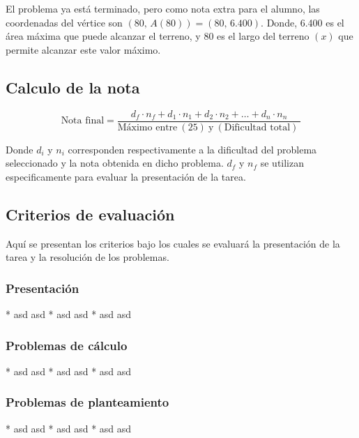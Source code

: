 \documentclass[]{srs2}
\begin{document}
El problema ya está terminado, pero como nota extra para el alumno,
las coordenadas del vértice son
\(\left(80,\,A\left(80\right)\right) = (80,\, 6.400)\). Donde, 6.400
es el área máxima que puede alcanzar el terreno, y 80 es el largo
del terreno \(\left(x\right)\) que permite alcanzar este valor máximo.

\subsection*{Calculo de la nota}

\begin{equation*}
  \text{Nota final} = \dfrac{d_{f}\cdot n_{f} + d_1 \cdot n_1+d_2 \cdot n_2+\dots+d_n \cdot n_n}{\text{Máximo entre}~\left(25\right)~\text{y}~\left(\text{Dificultad total}\right)~}
\end{equation*}

Donde $d_i$ y $n_i$ corresponden respectivamente a la dificultad del problema
seleccionado y la nota obtenida en dicho problema. $d_f$ y $n_f$ se utilizan
especificamente para evaluar la presentación de la tarea.

\subsection*{Criterios de evaluación}

Aquí se presentan los criterios bajo los cuales se evaluará la presentación
de la tarea y la resolución de los problemas.

\subsubsection*{Presentación}
\begin{lista}
* asd asd
* asd asd
* asd asd
\end{lista}
\subsubsection*{Problemas de cálculo}
\begin{lista}
* asd asd
* asd asd
* asd asd
\end{lista}
\subsubsection*{Problemas de planteamiento}
\begin{lista}
* asd asd
* asd asd
* asd asd
\end{lista}
\end{document}
